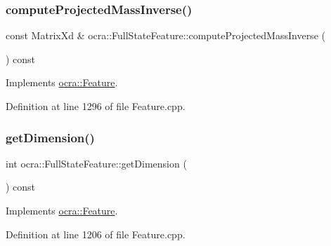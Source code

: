 \subsubsection{\texorpdfstring{compute\+Projected\+Mass\+Inverse()}{computeProjectedMassInverse()}\hspace{0.1cm}{\footnotesize\ttfamily [2/2]}}
{\footnotesize\ttfamily const Matrix\+Xd \& ocra\+::\+Full\+State\+Feature\+::compute\+Projected\+Mass\+Inverse (\begin{DoxyParamCaption}{ }\end{DoxyParamCaption}) const\hspace{0.3cm}{\ttfamily [virtual]}}



Implements \hyperlink{classocra_1_1Feature_ac27bcbdbb8541e3b4e2c77a6d6f2ffc0}{ocra\+::\+Feature}.



Definition at line 1296 of file Feature.\+cpp.

\hypertarget{classocra_1_1FullStateFeature_a62b4a9dd7055ab47105c8aefaa45611a}{}\label{classocra_1_1FullStateFeature_a62b4a9dd7055ab47105c8aefaa45611a} 
\subsubsection{\texorpdfstring{get\+Dimension()}{getDimension()}}
{\footnotesize\ttfamily int ocra\+::\+Full\+State\+Feature\+::get\+Dimension (\begin{DoxyParamCaption}{ }\end{DoxyParamCaption}) const\hspace{0.3cm}{\ttfamily [virtual]}}



Implements \hyperlink{classocra_1_1Feature_aeda4c2a5ffe638c3de30f8b91a11450e}{ocra\+::\+Feature}.



Definition at line 1206 of file Feature.\+cpp.

\hypertarget{classocra_1_1FullStateFeature_a2f6672c0d5a13df8fc4f38f011c8c32e}{}\label{classocra_1_1FullStateFeature_a2f6672c0d5a13df8fc4f38f011c8c32e} 
